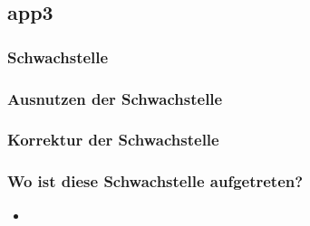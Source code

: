 \documentclass[12pt,a4paper,titlepage,oneside]{scrartcl}
\begin{document}

\subsection{app3}

\subsubsection{Schwachstelle}

\subsubsection{Ausnutzen der Schwachstelle}

\subsubsection{Korrektur der Schwachstelle}

\subsubsection{Wo ist diese Schwachstelle aufgetreten?}

\begin{itemize}
	\item
\end{itemize}

%
%
\end{document}
